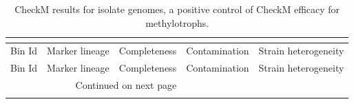 \begin{landscape}
\begin{singlespace}
\fontsize{8.5}{10}\selectfont
\begin{longtable}{p{} p{} ccc}
\caption[CheckM results for isolates]{
	CheckM results for isolate genomes, a positive control of CheckM efficacy for methylotrophs.
	} \\
\label{tab:checkm_isolate} \\
\toprule
                               Bin Id &                    Marker lineage &  Completeness &  Contamination &  Strain heterogeneity \\
\midrule \endfirsthead

\toprule
                               Bin Id &                    Marker lineage &  Completeness &  Contamination &  Strain heterogeneity \\
\midrule
\endhead
\midrule
\multicolumn{3}{r}{{Continued on next page}} \\
\midrule
\endfoot


\end{longtable}
\end{singlespace}
\end{landscape}
